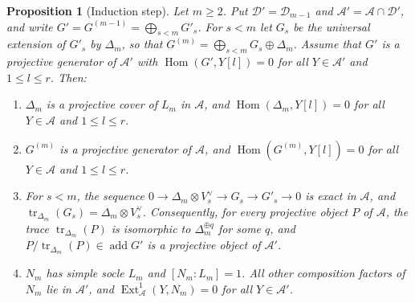 \documentclass[11pt,reqno]{amsart}
\theoremstyle{plain}
\newtheorem{proposition}[theorem]{Proposition}
\theoremstyle{definition}
\theoremstyle{remark}
\DeclareMathOperator{\Hom}{Hom}
\DeclareMathOperator{\Ext}{Ext}
\DeclareMathOperator{\add}{add}
\DeclareMathOperator{\tr}{tr}
\newcommand{\cD}{\mathcal{D}}
\newcommand{\cA}{\mathcal{A}}
\begin{document}
\begin{proposition}[Induction step]\label{prop:step}
Let $m\ge2$. Put $\cD'=\cD_{m-1}$ and $\cA'=\cA\cap\cD'$, and write $G'=G^{(m-1)}=\bigoplus_{s<m}G'_s$. For $s<m$ let $G_s$ be the universal extension of $G'_s$ by $\Delta_m$, so that $G^{(m)}=\bigoplus_{s<m}G_s\oplus\Delta_m$. Assume that $G'$ is a projective generator of $\cA'$ with $\Hom(G',Y[l])=0$ for all $Y\in\cA'$ and $1\le l\le r$. Then:
\begin{enumerate}
\item $\Delta_m$ is a projective cover of $L_m$ in $\cA$, and $\Hom(\Delta_m,Y[l])=0$ for all $Y\in\cA$ and $1\le l\le r$.
\item $G^{(m)}$ is a projective generator of $\cA$, and $\Hom(G^{(m)},Y[l])=0$ for all $Y\in\cA$ and $1\le l\le r$.
\item For $s<m$, the sequence $0\to\Delta_m\otimes V_s^\vee\to G_s\to G'_s\to0$ is exact in $\cA$, and $\tr_{\Delta_m}(G_s)=\Delta_m\otimes V_s^\vee$. Consequently, for every projective object $P$ of $\cA$, the trace $\tr_{\Delta_m}(P)$ is isomorphic to $\Delta_m^{\oplus q}$ for some $q$, and $P/\tr_{\Delta_m}(P)\in\add G'$ is a projective object of $\cA'$.
\item $N_m$ has simple socle $L_m$ and $[N_m:L_m]=1$. All other composition factors of $N_m$ lie in $\cA'$, and $\Ext^1_\cA(Y,N_m)=0$ for all $Y\in\cA'$.
\end{enumerate}
\end{proposition}
\end{document}

